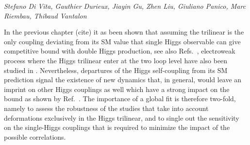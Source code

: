 \begin{center}
\textit{Stefano Di Vita, Gauthier Durieux, Jiayin Gu, Zhen Liu, Giuliano Panico, Marc Riembau, Thibaud Vantalon}
\end{center} 

In the previous chapter (cite) it as been shown that assuming the trilinear is the only coupling deviating from its SM value that single Higgs observable can give competitive bound with double Higgs production, see also Refs.~\cite{Gorbahn:2016uoy,Degrassi:2016wml,Bizon:2016wgr,Degrassi:2017ucl,Maltoni:2017ims}, electroweak process where the Higgs trilinear enter at the two loop level have also been studied in \cite{Kribs:2017znd}. Nevertheless, departures of the Higgs self-coupling from its SM prediction signal the existence of new dynamics that, in general, would leave an imprint on other Higgs couplings as well which have a strong impact on the bound as shown by Ref.~\cite{DiVita:2017eyz}. The importance of a global fit is therefore two-fold, namely to assess the robustness of the studies that take into account deformations exclusively in the Higgs trilinear, and to single out the sensitivity on the single-Higgs couplings that is required to minimize the impact of the possible correlations.
	
	
	
\medskip

